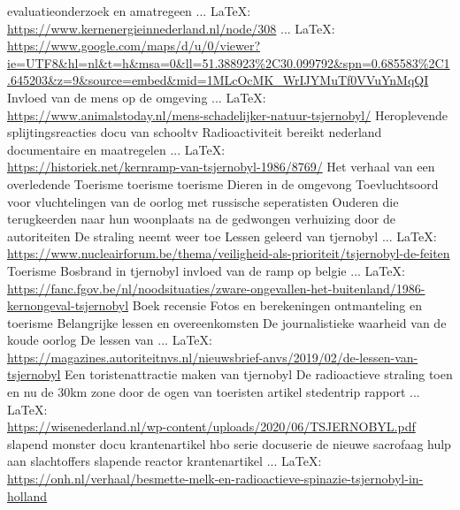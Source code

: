 \begin{thebibliography}{99}
{{{	evaluatieonderzoek en amatregeen
	 ... \LaTeX:\\ \url{https://www.kernenergieinnederland.nl/node/308}
	 ... \LaTeX:\\ \url{https://www.google.com/maps/d/u/0/viewer?ie=UTF8&hl=nl&t=h&msa=0&ll=51.388923%2C30.099792&spn=0.685583%2C1.645203&z=9&source=embed&mid=1MLcOcMK_WrIJYMuTf0VVuYnMqQI}
	Invloed van de mens op de omgeving
	 ... \LaTeX:\\ \url{https://www.animalstoday.nl/mens-schadelijker-natuur-tsjernobyl/}
	Heroplevende splijtingsreacties
	docu van schooltv
	Radioactiviteit bereikt nederland
	documentaire en maatregelen
	 ... \LaTeX:\\ \url{https://historiek.net/kernramp-van-tsjernobyl-1986/8769/}
	Het verhaal van een overledende
	Toerisme
	toerisme
	toerisme
	Dieren in de omgevong
	Toevluchtsoord voor vluchtelingen van de oorlog met russische seperatisten
	Ouderen die terugkeerden naar hun woonplaats na de gedwongen verhuizing door de autoriteiten
	De straling neemt weer toe
	Lessen geleerd van tjernobyl
	 ... \LaTeX:\\ \url{https://www.nucleairforum.be/thema/veiligheid-als-prioriteit/tsjernobyl-de-feiten}
	Toerisme
	Bosbrand in tjernobyl
	invloed van de ramp op belgie
	 ... \LaTeX:\\ \url{https://fanc.fgov.be/nl/noodsituaties/zware-ongevallen-het-buitenland/1986-kernongeval-tsjernobyl}
	Boek recensie
	Fotos en berekeningen
	ontmanteling en toerisme
	Belangrijke lessen en overeenkomsten
	De journalistieke waarheid van de koude oorlog
	De lessen van
	 ... \LaTeX:\\ \url{https://magazines.autoriteitnvs.nl/nieuwsbrief-anvs/2019/02/de-lessen-van-tsjernobyl}
	Een toristenattractie maken van tjernobyl
	De radioactieve straling toen en nu
	de 30km zone door de ogen van toeristen
	artikel
	stedentrip
	rapport
	 ... \LaTeX:\\ \url{https://wisenederland.nl/wp-content/uploads/2020/06/TSJERNOBYL.pdf}
	slapend monster
	docu
	krantenartikel
	hbo serie
	docuserie
	de  nieuwe sacrofaag
	hulp aan slachtoffers
	slapende reactor
	krantenartikel
	 ... \LaTeX:\\ \url{https://onh.nl/verhaal/besmette-melk-en-radioactieve-spinazie-tsjernobyl-in-holland}
}}}
\end{thebibliography}
